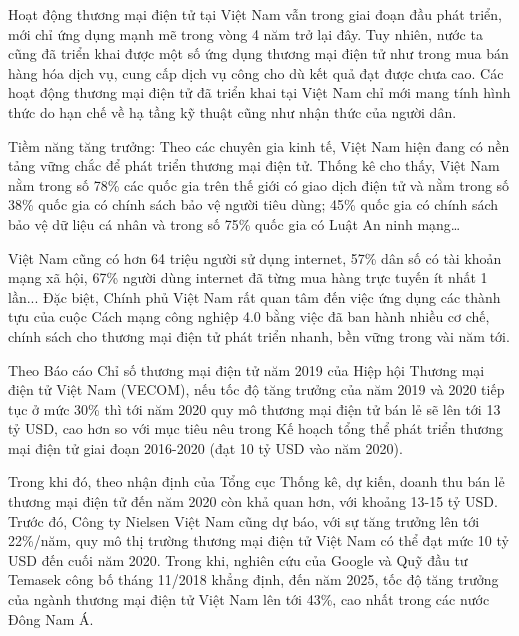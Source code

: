 \documentclass[12pt]{article}
\begin{document}
Hoạt động thương mại điện tử tại Việt Nam vẫn trong giai đoạn đầu phát triển, mới chỉ ứng dụng mạnh mẽ trong vòng 4 năm trở lại đây. Tuy nhiên, nước ta cũng đã triển khai được một số ứng dụng thương mại điện tử như trong mua bán hàng hóa dịch vụ, cung cấp dịch vụ công cho dù kết quả đạt được chưa cao. Các hoạt động thương mại điện tử đã triển khai tại Việt Nam chỉ mới mang tính hình thức do hạn chế về hạ tầng kỹ thuật cũng như nhận thức của người dân.  

Tiềm năng tăng trưởng: Theo các chuyên gia kinh tế, Việt Nam hiện đang có nền tảng vững chắc để phát triển thương mại điện tử. Thống kê cho thấy, Việt Nam nằm trong số 78\% các quốc gia trên thế giới có giao dịch điện tử và nằm trong số 38\% quốc gia có chính sách bảo vệ người tiêu dùng; 45\% quốc gia có chính sách bảo vệ dữ liệu cá nhân và trong số 75\% quốc gia có Luật An ninh mạng…

Việt Nam cũng có hơn 64 triệu người sử dụng internet, 57\% dân số có tài khoản mạng xã hội, 67\% người dùng internet đã từng mua hàng trực tuyến ít nhất 1 lần... Đặc biệt, Chính phủ Việt Nam rất quan tâm đến việc ứng dụng các thành tựu của cuộc Cách mạng công nghiệp 4.0 bằng việc đã ban hành nhiều cơ chế, chính sách cho thương mại điện tử phát triển nhanh, bền vững trong vài năm tới.

Theo Báo cáo Chỉ số thương mại điện tử năm 2019 của Hiệp hội Thương mại điện tử Việt Nam (VECOM), nếu tốc độ tăng trưởng của năm 2019 và 2020 tiếp tục ở mức 30\% thì tới năm 2020 quy mô thương mại điện tử bán lẻ sẽ lên tới 13 tỷ USD, cao hơn so với mục tiêu nêu trong Kế hoạch tổng thể phát triển thương mại điện tử giai đoạn 2016-2020 (đạt 10 tỷ USD vào năm 2020).

Trong khi đó, theo nhận định của Tổng cục Thống kê, dự kiến, doanh thu bán lẻ thương mại điện tử đến năm 2020 còn khả quan hơn, với khoảng 13-15 tỷ USD. Trước đó, Công ty Nielsen Việt Nam cũng dự báo, với sự tăng trưởng lên tới 22\%/năm, quy mô thị trường thương mại điện tử Việt Nam có thể đạt mức 10 tỷ USD đến cuối năm 2020. Trong khi, nghiên cứu của Google và Quỹ đầu tư Temasek công bố tháng 11/2018 khẳng định, đến năm 2025, tốc độ tăng trưởng của ngành thương mại điện tử Việt Nam lên tới 43\%, cao nhất trong các nước Đông Nam Á.
\end{document}
